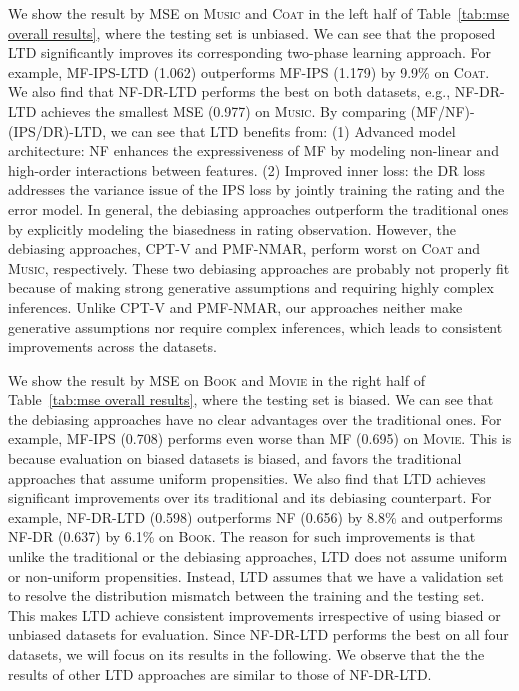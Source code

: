 \documentclass[letterpaper]{article} %
\begin{document}
We show the result by MSE on \textsc{Music} and \textsc{Coat} in the left half of Table~\ref{tab:mse overall results}, where the testing set is unbiased.
We can see that the proposed LTD significantly improves its corresponding two-phase learning approach.
For example, MF-IPS-LTD (1.062) outperforms MF-IPS (1.179) by 9.9\% on \textsc{Coat}.
We also find that NF-DR-LTD performs the best on both datasets, e.g., NF-DR-LTD achieves the smallest MSE (0.977) on \textsc{Music}.
By comparing (MF/NF)-(IPS/DR)-LTD, we can see that LTD benefits from:
(1) Advanced model architecture: NF enhances the expressiveness of MF by modeling non-linear and high-order interactions between features.
(2) Improved inner loss: the DR loss addresses the variance issue of the IPS loss by jointly training the rating and the error model.
In general, the debiasing approaches outperform the traditional ones by explicitly modeling the biasedness in rating observation.
However, the debiasing approaches, CPT-V and PMF-NMAR, perform worst on \textsc{Coat} and \textsc{Music}, respectively.
These two debiasing approaches are probably not properly fit because of making strong generative assumptions and requiring highly complex inferences.
Unlike CPT-V and PMF-NMAR, our approaches neither make generative assumptions nor require complex inferences, which leads to consistent improvements across the datasets.

We show the result by MSE on \textsc{Book} and \textsc{Movie} in the right half of Table~\ref{tab:mse overall results}, where the testing set is biased.
We can see that the debiasing approaches have no clear advantages over the traditional ones.
For example, MF-IPS (0.708) performs even worse than MF (0.695) on \textsc{Movie}.
This is because evaluation on biased datasets is biased, and favors the traditional approaches that assume uniform propensities.
We also find that LTD achieves significant improvements over its traditional and its debiasing counterpart.
For example, NF-DR-LTD (0.598) outperforms NF (0.656) by 8.8\% and outperforms NF-DR (0.637) by 6.1\% on \textsc{Book}.
The reason for such improvements is that unlike the traditional or the debiasing approaches, LTD does not assume uniform or non-uniform propensities.
Instead, LTD assumes that we have a validation set to resolve the distribution mismatch between the training and the testing set.
This makes LTD achieve consistent improvements irrespective of using biased or unbiased datasets for evaluation.
Since NF-DR-LTD performs the best on all four datasets, we will focus on its results in the following.
We observe that the the results of other LTD approaches are similar to those of NF-DR-LTD.
\end{document}
